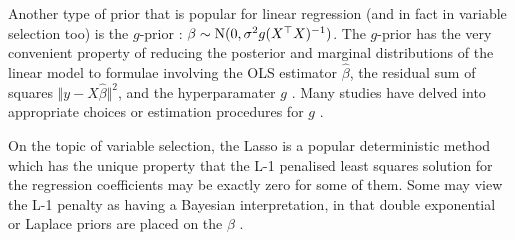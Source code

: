 Another type of prior that is popular for linear regression (and in fact in variable selection too) is the $g$-prior \citep{zellner1986assessing}: $\beta \sim \operatorname{N}(0, \sigma^2 g (X^\top X)^{-1})$.
The $g$-prior has the very convenient property of reducing the posterior and marginal distributions of the linear model to formulae involving the OLS estimator $\hat\beta$, the residual sum of squares $\Vert y - X\hat\beta \Vert^2$, and the hyperparamater $g$ \citep{fernandez2001benchmark}.
Many studies have delved into appropriate choices or estimation procedures for $g$ \citep{liang2008mixtures}.

On the topic of variable selection, the Lasso \citep{tibshirani1996regression} is a popular deterministic method which has the unique property that the L-1 penalised least squares solution for the regression coefficients may be exactly zero for some of them.
Some may view the L-1 penalty as having a Bayesian interpretation, in that double exponential or Laplace priors are placed on the $\beta$ \citep{park2008bayesian}.

